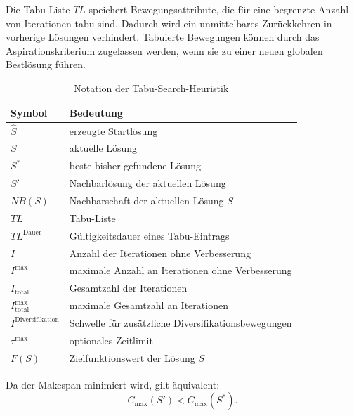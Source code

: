 Die Tabu-Liste \(TL\) speichert Bewegungsattribute, die für eine begrenzte Anzahl von Iterationen tabu sind.
Dadurch wird ein unmittelbares Zurückkehren in vorherige Lösungen verhindert.
Tabuierte Bewegungen können durch das Aspirationskriterium zugelassen werden, wenn sie zu einer neuen globalen Bestlösung führen.

\begin{table}[H]
    \centering
    \caption{Notation der Tabu-Search-Heuristik}
    \label{tab:notation_tabu}
    \begin{tabular}{ll}
        \hline
        \textbf{Symbol}                & \textbf{Bedeutung}                                  \\
        \hline
        \(\hat{S}\)                    & erzeugte Startlösung                                \\
        \(S\)                          & aktuelle Lösung                                     \\
        \(S^\ast\)                     & beste bisher gefundene Lösung                       \\
        \(S'\)                         & Nachbarlösung der aktuellen Lösung                  \\
        \(NB(S)\)                      & Nachbarschaft der aktuellen Lösung \(S\)            \\
        \(TL\)                         & Tabu-Liste                                          \\
        \(TL^{\text{Dauer}}\)          & Gültigkeitsdauer eines Tabu-Eintrags                \\
        \(I\)                          & Anzahl der Iterationen ohne Verbesserung            \\
        \(I^{\max}\)                   & maximale Anzahl an Iterationen ohne Verbesserung    \\
        \(I_{\text{total}}\)           & Gesamtzahl der Iterationen                          \\
        \(I_{\text{total}}^{\max}\)    & maximale Gesamtzahl an Iterationen                  \\
        \(I^{\text{Diversifikation}}\) & Schwelle für zusätzliche Diversifikationsbewegungen \\
        \(\tau^{\max}\)                & optionales Zeitlimit                                \\
        \(F(S)\)                       & Zielfunktionswert der Lösung \(S\)                  \\
        \hline
    \end{tabular}
\end{table}


Da der Makespan minimiert wird, gilt äquivalent:
\[
    C_{\max}(S') < C_{\max}(S^\ast).
\]

